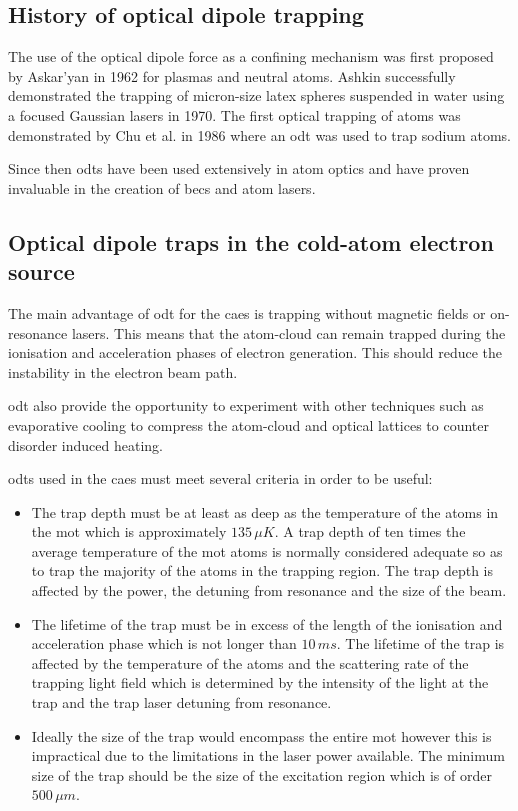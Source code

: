 \subsection{History of optical dipole trapping}
The use of the optical dipole force as a confining mechanism was first proposed by Askar'yan in 1962\cite{askaryan_effects_1962} for plasmas and neutral atoms. Ashkin successfully demonstrated the trapping of micron-size latex spheres suspended in water using a focused Gaussian lasers in 1970\cite{ashkin_acceleration_1970}. The first optical trapping of atoms was demonstrated by Chu et al. in 1986\cite{chu_experimental_1986} where an \gls{odt} was used to trap sodium atoms.

Since then \glspl{odt} have been used extensively in atom optics and have proven invaluable in the creation of \glspl{bec} and atom lasers.

\subsection{Optical dipole traps in the cold-atom electron source}

The main advantage of \gls{odt} for the \gls{caes} is trapping without magnetic fields or on-resonance lasers. This means that the atom-cloud can remain trapped during the ionisation and acceleration phases of electron generation. This should reduce the instability in the electron beam path.

\Gls{odt} also provide the opportunity to experiment with other techniques such as evaporative cooling to compress the atom-cloud and optical lattices\cite{fallani_bose-einstein_2005} to counter disorder induced heating\cite{gericke_disorder-induced_2003}.

\Glspl{odt} used in the \gls{caes} must meet several criteria in order to be useful:
\begin{itemize}
    \item The trap depth must be at least as deep as the temperature of the atoms in the \gls{mot} which is approximately $135\,\unit{\mu K}$. A trap depth of ten times the average temperature of the \gls{mot} atoms is normally considered adequate so as to trap the majority of the atoms in the trapping region. The trap depth is affected by the power, the detuning from resonance and the size of the beam.
    \item The lifetime of the trap must be in excess of the length of the  ionisation and acceleration phase which is not longer than $10\,\unit{ms}$. The lifetime of the trap is affected by the temperature of the atoms and the scattering rate of the trapping light field which is determined by the intensity of the light at the trap and the trap laser detuning from resonance.
    \item Ideally the size of the trap would encompass the entire \gls{mot} however this is impractical due to the limitations in the laser power available. The minimum size of the trap should be the size of the excitation region which is of order $500\,\unit{\mu m}$\cite{mcculloch_towards_2012}.
\end{itemize}

